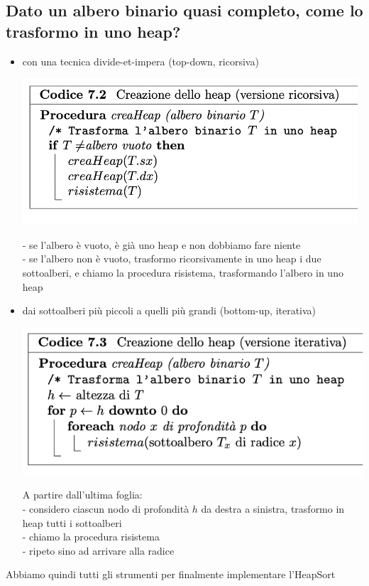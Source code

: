 \documentclass[11pt, oneside]{article}   	%
\begin{document}
\subsection*{Dato un albero binario quasi completo, come lo trasformo in uno heap?}
\begin{itemize}
\item con una tecnica divide-et-impera (top-down, ricorsiva)
\begin{center}
\includegraphics[scale=1]{creaheap1}
\end{center}
- se l'albero è vuoto, è già uno heap e non dobbiamo fare niente\\
- se l'albero non è vuoto, trasformo ricorsivamente in uno heap i due sottoalberi, e chiamo la procedura risistema, trasformando l'albero in uno heap
\item dai sottoalberi più piccoli a quelli più grandi (bottom-up, iterativa)
\begin{center}
\includegraphics[scale=1]{creaheap2}
\end{center}
A partire dall'ultima foglia:\\
- considero ciascun nodo di profondità $h$ da destra a sinistra, trasformo in heap tutti i sottoalberi\\
- chiamo la procedura risistema\\
- ripeto sino ad arrivare alla radice
\end{itemize}
Abbiamo quindi tutti gli strumenti per finalmente implementare l'HeapSort
\end{document}
